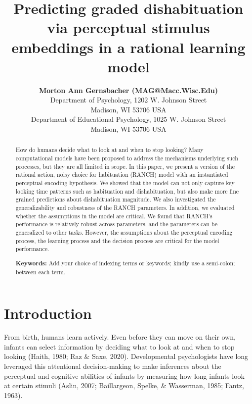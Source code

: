 \documentclass[10pt, letterpaper]{article}
\title{Predicting graded dishabituation via perceptual stimulus
embeddings in a rational learning model}
\author{{\large \bf Morton Ann Gernsbacher (MAG@Macc.Wisc.Edu)} \\ Department of Psychology, 1202 W. Johnson Street \\ Madison, WI 53706 USA \AND {\large \bf Sharon J.~Derry (SDJ@Macc.Wisc.Edu)} \\ Department of Educational Psychology, 1025 W. Johnson Street \\ Madison, WI 53706 USA}
\begin{document}
\maketitle

\begin{abstract}
How do humans decide what to look at and when to stop looking? Many
computational models have been proposed to address the mechanisms
underlying such processes, but they are all limited in scope. In this
paper, we present a version of the rational action, noisy choice for
habituation (RANCH) model with an instantiated perceptual encoding
hypothesis. We showed that the model can not only capture key looking
time patterns such as habituation and dishabituation, but also make more
fine grained predictions about dishabituation magnitude. We also
investigated the generalizability and robustness of the RANCH
parameters. In addition, we evaluated whether the assumptions in the
model are critical. We found that RANCH's performance is relatively
robust across parameters, and the parameters can be generalized to other
tasks. However, the assumptions about the perceptual encoding process,
the learning process and the decision process are critical for the model
performance.

\textbf{Keywords:}
Add your choice of indexing terms or keywords; kindly use a semi-colon;
between each term.
\end{abstract}

\hypertarget{introduction}{%
\section{Introduction}\label{introduction}}

From birth, humans learn actively. Even before they can move on their
own, infants can select information by deciding what to look at and when
to stop looking (Haith, 1980; Raz \& Saxe, 2020). Developmental
psychologists have long leveraged this attentional decision-making to
make inferences about the perceptual and cognitive abilities of infants
by measuring how long infants look at certain stimuli (Aslin, 2007;
Baillargeon, Spelke, \& Wasserman, 1985; Fantz, 1963).
\end{document}
